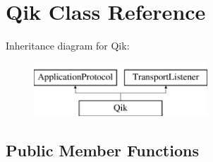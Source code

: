 \hypertarget{class_qik}{}\section{Qik Class Reference}
\label{class_qik}
Inheritance diagram for Qik\+:\begin{figure}[H]
\begin{center}
\leavevmode
\includegraphics[height=2.000000cm]{class_qik}
\end{center}
\end{figure}
\subsection*{Public Member Functions}
